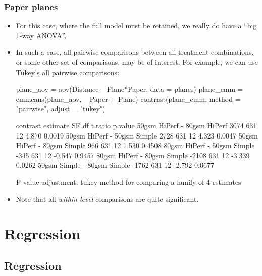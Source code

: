 \documentclass[a4paper]{article}
\begin{document}
\subsubsection{Paper planes}
\begin{itemize}
	\item For this case, where the full model must be retained, we really do have a ``big 1-way ANOVA''.
	\item In such a case, all pairwise comparisons between all treatment combinations, or some other set of comparisons, may be of interest. For example, we can use Tukey's all pairwise comparisons:
\begin{Schunk}
\begin{Sinput}
plane_aov = aov(Distance ~ Plane*Paper, data = planes)
plane_emm = emmeans(plane_aov,  ~ Paper + Plane)
contrast(plane_emm, method = "pairwise", adjust = "tukey")
\end{Sinput}
\begin{Soutput}
 contrast                    estimate  SE df t.ratio p.value
 50gsm HiPerf - 80gsm HiPerf     3074 631 12   4.870  0.0019
 50gsm HiPerf - 50gsm Simple     2728 631 12   4.323  0.0047
 50gsm HiPerf - 80gsm Simple      966 631 12   1.530  0.4508
 80gsm HiPerf - 50gsm Simple     -345 631 12  -0.547  0.9457
 80gsm HiPerf - 80gsm Simple    -2108 631 12  -3.339  0.0262
 50gsm Simple - 80gsm Simple    -1762 631 12  -2.792  0.0677

P value adjustment: tukey method for comparing a family of 4 estimates 
\end{Soutput}
\end{Schunk}
	\item Note that all \textit{within-level} comparisons are quite significant.
\end{itemize}

\section{Regression}\label{sec:26}
\subsection{Regression}
\end{document}
